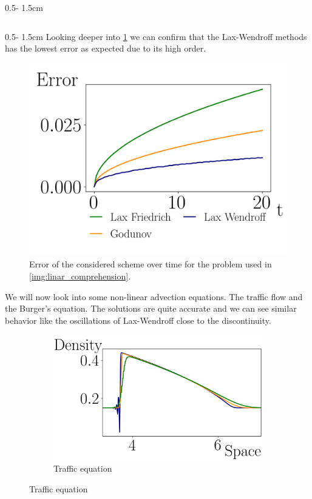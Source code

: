 \documentclass{uibposter}
\begin{document}
\begin{frame}[fragile]
\begin{columns}
\begin{column}{0.5\textwidth - 1.5cm}
\begin{column}{0.5\textwidth - 1.5cm}
\vspace{0.5cm}
Looking deeper into \cref{img:error_over_time} we can confirm that the Lax-Wendroff methods has the lowest error as expected due to its high order.
   
    \begin{figure}
    	\includegraphics{fig/error_over_time.png}
    	\caption{Error of the considered scheme over time for the problem used in \cref{img:linar_comprehension}.}
    	\label{img:error_over_time}
    \end{figure}

We will now look into some non-linear advection equations. The traffic flow and the Burger's equation. The solutions are quite accurate and we can see similar behavior like the oscillations of Lax-Wendroff close to the discontinuity.

\begin{figure}
	\begin{subfigure}{\textwidth}
	\includegraphics{fig/traffic_compare_.png}
	\caption{Traffic equation}
	\label{img:traffic_comprehension}
	\end{subfigure}


\end{figure}
\end{column}
\end{column}
\end{columns}
\end{frame}
\end{document}
